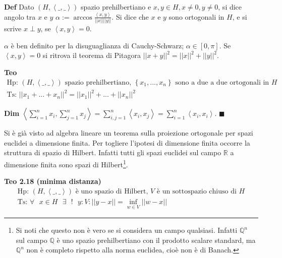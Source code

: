 \documentclass{article}
\begin{document}
\textbf{Def} Dato $\left( H,\left\langle \_,\_\right\rangle \right) $ spazio
prehilbertiano e $x,y\in H,x\neq 0,y\neq 0$, si dice angolo tra $x$ e $y$ $%
\alpha :=\arccos \frac{\left\langle x,y\right\rangle }{\left\vert \left\vert
x\right\vert \right\vert \left\vert \left\vert y\right\vert \right\vert }$.
Si dice che $x$ e $y$ sono ortogonali in $H$, e si scrive $x\perp y$, se $%
\left\langle x,y\right\rangle =0$.

$\alpha $ \`{e} ben definito per la disuguaglianza di Cauchy-Schwarz; $%
\alpha \in \left[ 0,\pi \right] $. Se $\left\langle x,y\right\rangle =0$ si
ritrova il teorema di Pitagora $\left\vert \left\vert x+y\right\vert
\right\vert ^{2}=\left\vert \left\vert x\right\vert \right\vert
^{2}+\left\vert \left\vert y\right\vert \right\vert ^{2}$.

\textbf{Teo}%
\begin{gather*}
\text{Hp: }\left( H,\left\langle \_,\_\right\rangle \right) \text{ spazio
prehilbertiano, }\left\{ x_{1},...,x_{n}\right\} \text{ sono a due a due
ortogonali in }H \\
\text{Ts: }\left\vert \left\vert x_{1}+...+x_{n}\right\vert \right\vert
^{2}=\left\vert \left\vert x_{1}\right\vert \right\vert ^{2}+...+\left\vert
\left\vert x_{n}\right\vert \right\vert ^{2}
\end{gather*}

\textbf{Dim} $\left\langle
\sum_{i=1}^{n}x_{i},\sum_{j=1}^{n}x_{j}\right\rangle
=\sum_{i,j=1}^{n}\left\langle x_{i},x_{j}\right\rangle
=\sum_{i=1}^{n}\left\langle x_{i},x_{i}\right\rangle $. $\blacksquare $

Si \`{e} gi\`{a} visto ad algebra lineare un teorema sulla proiezione
ortogonale per spazi euclidei a dimensione finita. Per togliere l'ipotesi di
dimensione finita occorre la struttura di spazio di Hilbert. Infatti tutti
gli spazi euclidei sul campo $%
\mathbb{R}
$ a dimensione finita sono spazi di Hilbert\footnote{%
Si noti che questo non \`{e} vero se si considera un campo qualsiasi.
Infatti $%
\mathbb{Q}
^{n}$ sul campo $%
\mathbb{Q}
$ \`{e} uno spazio prehilbertiano con il prodotto scalare standard, ma $%
\mathbb{Q}
^{n}$ non \`{e} completo rispetto alla norma euclidea, cio\`{e} non \`{e} di
Banach.}.

\textbf{Teo 2.18 (minima distanza)}%
\begin{gather*}
\text{Hp}\text{: }\left( H,\left\langle \_,\_\right\rangle \right) \text{ 
\`{e} uno spazio di Hilbert, }V\text{ \`{e} un sottospazio chiuso di }H \\
\text{Ts}\text{: }\forall \text{ }x\in H\text{ }\exists \text{ }!\text{ }%
y:V:\left\vert \left\vert y-x\right\vert \right\vert =\inf_{w\in
V}\left\vert \left\vert w-x\right\vert \right\vert
\end{gather*}
\end{document}
